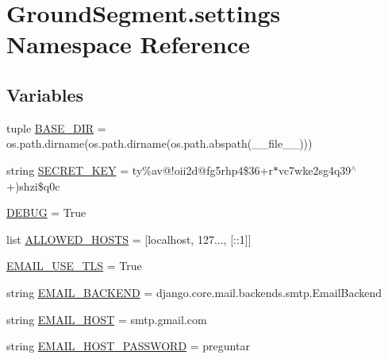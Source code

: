 \hypertarget{namespace_ground_segment_1_1settings}{}\section{Ground\+Segment.\+settings Namespace Reference}
\label{namespace_ground_segment_1_1settings}
\subsection*{Variables}
\begin{DoxyCompactItemize}
\item 
tuple \hyperlink{namespace_ground_segment_1_1settings_a96d9de6863371f2594631eee01ef0600}{B\+A\+S\+E\+\_\+\+D\+I\+R} = os.\+path.\+dirname(os.\+path.\+dirname(os.\+path.\+abspath(\+\_\+\+\_\+file\+\_\+\+\_\+)))
\item 
string \hyperlink{namespace_ground_segment_1_1settings_a962d63c2c779045196141e0ac3e0415a}{S\+E\+C\+R\+E\+T\+\_\+\+K\+E\+Y} = \textquotesingle{}ty\%av@!oii2d@fg5rhp4\$36+r$\ast$vc7wke2sg4q39$^\wedge$+)shzi\$q0c\textquotesingle{}
\item 
\hyperlink{namespace_ground_segment_1_1settings_a7398b478a987ae21647fbb08b265ad10}{D\+E\+B\+U\+G} = True
\item 
list \hyperlink{namespace_ground_segment_1_1settings_ae76a78e05b49fb40b628ba756d926bc9}{A\+L\+L\+O\+W\+E\+D\+\_\+\+H\+O\+S\+T\+S} = \mbox{[}\textquotesingle{}localhost\textquotesingle{}, \textquotesingle{}127...\textquotesingle{}, \textquotesingle{}\mbox{[}\+::1\mbox{]}\textquotesingle{}\mbox{]}
\item 
\hyperlink{namespace_ground_segment_1_1settings_a8f145226f6aaa8becf7066ef790b389b}{E\+M\+A\+I\+L\+\_\+\+U\+S\+E\+\_\+\+T\+L\+S} = True
\item 
string \hyperlink{namespace_ground_segment_1_1settings_ada1dcaeb590c4106b8bd01b0bf16d8c7}{E\+M\+A\+I\+L\+\_\+\+B\+A\+C\+K\+E\+N\+D} = \textquotesingle{}django.\+core.\+mail.\+backends.\+smtp.\+Email\+Backend\textquotesingle{}
\item 
string \hyperlink{namespace_ground_segment_1_1settings_a543f885a8ff97df8e4e3c215d0ef42a8}{E\+M\+A\+I\+L\+\_\+\+H\+O\+S\+T} = \textquotesingle{}smtp.\+gmail.\+com\textquotesingle{}
\item 
string \hyperlink{namespace_ground_segment_1_1settings_aedd7c143f3020b0a1156e678dc353726}{E\+M\+A\+I\+L\+\_\+\+H\+O\+S\+T\+\_\+\+P\+A\+S\+S\+W\+O\+R\+D} = \textquotesingle{}preguntar\textquotesingle{}
\item 

\end{DoxyCompactItemize}
